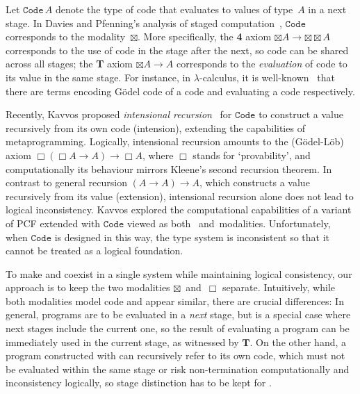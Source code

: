 \documentclass[a4paper,UKenglish,numberwithinsect,cleveref,thm-restate]{lipics-v2021}
\numberwithin{equation}{section}
\theoremstyle{definition}
\theoremstyle{plain}
\begin{document}
Let $\mathtt{Code}\,A$ denote the type of code that evaluates to values of type~$A$ in a next stage.
In Davies and Pfenning's analysis of staged computation~\cite{Davies2001b}, $\mathtt{Code}$ corresponds to the \SFour modality~$\boxtimes$.
More specifically, the \textbf{4} axiom $\boxtimes A \to {\boxtimes} {\boxtimes} A$ corresponds to the use of code in the stage after the next, so code can be shared across all stages;
the \textbf{T} axiom $\boxtimes A \to A$ corresponds to the \emph{evaluation} of code to its value in the same stage.
For instance, in $\lambda$-calculus, it is well-known~\cite{Barendregt1984a} that there are terms encoding Gödel code of a code and evaluating a code respectively.

Recently, Kavvos proposed \emph{intensional recursion}~\cite{Kavvos2017a} for $\mathtt{Code}$ to construct a value recursively from its own code (intension), extending the capabilities of metaprogramming.
Logically, intensional recursion amounts to the \GL (Gödel-Löb) axiom $\Box (\Box A \to A) \to \Box A$, where $\Box$ stands for `provability', and computationally its behaviour mirrors Kleene's second recursion theorem.
In contrast to general recursion $(A \to A) \to A$, which constructs a value recursively from its value (extension), intensional recursion alone does not lead to logical inconsistency.
Kavvos explored the computational capabilities of a variant of PCF extended with $\mathtt{Code}$ viewed as both \SFour~and~\GL modalities.
Unfortunately, when $\mathtt{Code}$ is designed in this way, the type system is inconsistent so that it cannot be treated as a logical foundation.

To make \SFour and \GL coexist in a single system while maintaining logical consistency, our approach is to keep the two modalities $\boxtimes$~and~$\Box$ separate.
Intuitively, while both modalities model code and appear similar, there are crucial differences:
In general, programs are to be evaluated in a \emph{next} stage, but \SFour is a special case where next stages include the current one, so the result of evaluating a program can be immediately used in the current stage, as witnessed by $\mathbf{T}$.
On the other hand, a program constructed with \GL can recursively refer to its own code, which must not be evaluated within the same stage or risk non-termination computationally and inconsistency logically, so stage distinction has to be kept for \GL.
\end{document}
